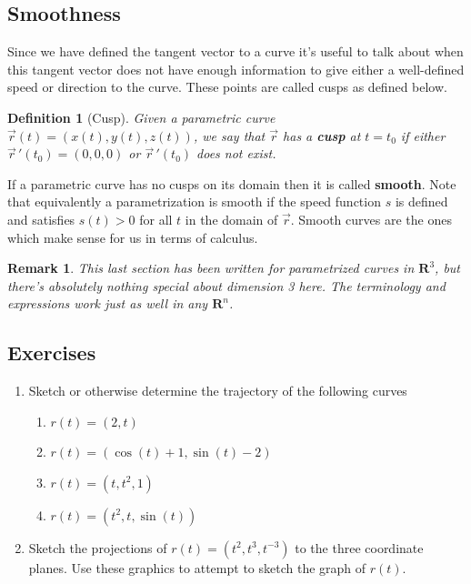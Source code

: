 \documentclass[12pt]{article}
\numberwithin{equation}{subsection}
\numberwithin{figure}{subsection}
\newtheorem{defn}[subsection]{Definition}
\theoremstyle{note}
\newtheorem{remark}[subsection]{Remark}
\begin{document}
{\subsection{Smoothness} \label{sec-smooth}
Since we have defined the tangent vector to a curve it's useful to talk about when this tangent vector does not have enough information to give either a well-defined speed or direction to the curve. These points are called cusps as defined below.

\begin{defn}[Cusp] Given a parametric curve $\vec{r}(t)=(x(t),y(t),z(t))$, we say that $\vec{r}$ has a \textbf{cusp} at $t=t_0$ if either $\vec{r}\,'(t_0)=(0,0,0)$ or $\vec{r}\,'(t_0)$ does not exist. \end{defn}

If a parametric curve has no cusps on its domain then it is called \textbf{smooth}. Note that equivalently a parametrization is smooth if the speed function $s$ is defined and satisfies $s(t)>0$ for all $t$ in the domain of $\vec{r}$. Smooth curves are the ones which make sense for us in terms of calculus.

\begin{remark}
This last section has been written for parametrized curves in $\mathbf{R}^3$, but there's absolutely nothing special about dimension 3 here. The terminology and expressions work just as well in any $\mathbf{R}^n$.
\end{remark}

\subsection{Exercises} 
\begin{enumerate}[label=\arabic*.]
\item Sketch or otherwise determine the trajectory of the following curves

\begin{enumerate}
	\item $r(t)=(2, t)$
	\item $r(t)=(\cos(t)+1, \sin(t)-2)$
	\item $r(t)=(t,t^2,1)$
	\item $r(t)=(t^2, t, \sin(t))$

\end{enumerate}

\item Sketch the projections of $r(t)=(t^2,t^3, t^{-3})$ to the three coordinate planes. Use these graphics to attempt to sketch the graph of $r(t)$.




\end{enumerate}}
\end{document}
